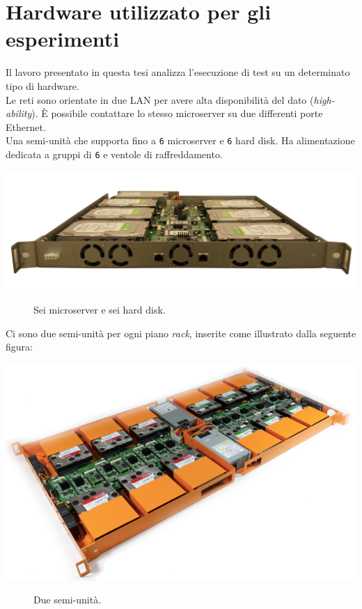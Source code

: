 \item
\section{Hardware utilizzato per gli esperimenti}
Il lavoro presentato in questa tesi analizza l'esecuzione di test su un determinato tipo di hardware.\\

Le reti sono orientate in due LAN per avere alta disponibilit\`{a} del dato (\textit{high-ability}). \`{E} possibile contattare lo stesso microserver su due differenti porte Ethernet.\\
Una semi-unit\`{a} che supporta fino a \verb"6" microserver e \verb"6" hard disk. Ha alimentazione dedicata a gruppi di \verb"6" e ventole di raffreddamento.

\begin{center}
\includegraphics[scale=0.20]{img/CY7.png}\\
\end{center}
\begin{figure}[htbp]
\caption{Sei microserver e sei hard disk. \label{fig:CY7}}
\end{figure}

Ci sono due semi-unit\`{a} per ogni piano \textit{rack}, inserite come illustrato dalla seguente figura:

\begin{center}
\includegraphics[scale=0.40]{img/CY7x2.png}
\end{center}
\begin{figure}[htbp]
\caption{Due semi-unit\`{a}. \label{fig:CY7x2}}
\end{figure}

